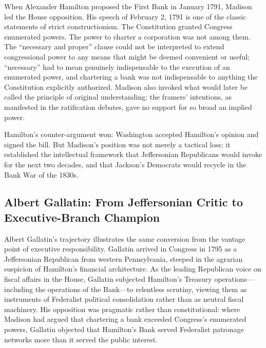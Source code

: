 \documentclass[12pt]{article}
\begin{document}
When Alexander Hamilton proposed the First Bank in January 1791,
Madison led the House opposition.  His speech of February 2, 1791 is one
of the classic statements of strict constructionism.  The Constitution
granted Congress enumerated powers.  The power to charter a corporation
was not among them.  The ``necessary and proper'' clause could not
be interpreted to extend congressional power to any means that might be
deemed convenient or useful; ``necessary'' had to mean genuinely
indispensable to the execution of an enumerated power, and chartering a
bank was not indispensable to anything the Constitution explicitly
authorized.  Madison also invoked what would later be called
the principle of original understanding: the framers'
intentions, as manifested in the ratification debates, gave no
support for so broad an implied power.

Hamilton's counter-argument won: Washington accepted Hamilton's opinion
and signed the bill.  But Madison's position was not merely a tactical
loss; it established the intellectual framework that Jeffersonian
Republicans would invoke for the next two decades, and that Jackson's
Democrats would recycle in the Bank War of the 1830s.

\subsection{Albert Gallatin: From Jeffersonian Critic to
             Executive-Branch Champion}

Albert Gallatin's trajectory illustrates the same conversion from the
vantage point of executive responsibility.  Gallatin arrived in Congress
in 1795 as a Jeffersonian Republican from western Pennsylvania, steeped
in the agrarian suspicion of Hamilton's financial architecture.  As the
leading Republican voice on fiscal affairs in the House, Gallatin
subjected Hamilton's Treasury operations---including the operations of
the Bank---to relentless scrutiny, viewing them as instruments of
Federalist political consolidation rather than as neutral fiscal
machinery.  His opposition was pragmatic rather than constitutional:
where Madison had argued that chartering a bank exceeded Congress's
enumerated powers, Gallatin objected that Hamilton's Bank served
Federalist patronage networks more than it served the public interest.
\end{document}
